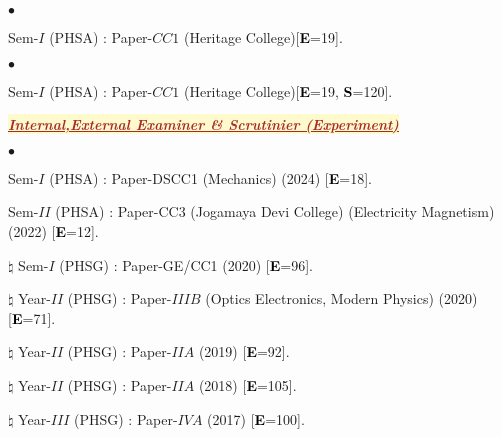 \documentclass[margin,line]{res}
\newenvironment{list1}{
  \begin{list}{\ding{113}}{%
      \setlength{\itemsep}{0in}
      \setlength{\parsep}{0in} \setlength{\parskip}{0in}
      \setlength{\topsep}{0in} \setlength{\partopsep}{0in} 
      \setlength{\leftmargin}{0.17in}}}{\end{list}}
\newenvironment{list2}{
  \begin{list}{$\bullet$}{%
      \setlength{\itemsep}{0in}
      \setlength{\parsep}{0in} \setlength{\parskip}{0in}
      \setlength{\topsep}{0in} \setlength{\partopsep}{0in} 
      \setlength{\leftmargin}{0.2in}}}{\end{list}}
\begin{document}
\begin{resume}
\begin{list2}
\item Sem-$I$ (PHSA) : Paper-$CC1$ (Heritage College)[\textcolor{black}{\bf E}=19].
\end{list2}
\begin{list1}
\item[] \textcolor{iris}{}
\vspace{1mm}
\end{list1}
\begin{list2}
\item Sem-$I$ (PHSA) : Paper-$CC1$ (Heritage College)[\textcolor{black}{\bf E}=19, \textcolor{black}{\bf S}=120]. 
\end{list2}
\begin{list1}
\item[] \colorbox{lemonchiffon}{\textcolor{brown}{\underline{\textbf{\textit{Internal,External Examiner \& Scrutinier (Experiment)}}}}}
\vspace{1mm}
\end{list1}
\begin{list2}
\item Sem-$I$ (PHSA) : Paper-DSCC1 (Mechanics) (2024) [\textcolor{black}{\bf E}=18]. 
\item Sem-$II$ (PHSA) : Paper-CC3 (Jogamaya Devi College) (Electricity Magnetism) (2022) [\textcolor{black}{\bf E}=12]. 
\item[$\pmb{\natural}$] Sem-$I$ (PHSG) : Paper-GE/CC1 (2020) [\textcolor{black}{\bf E}=96]. 
\item[$\pmb{\natural}$] Year-$II$ (PHSG) : Paper-$IIIB$ (Optics Electronics, Modern Physics) (2020) [\textcolor{black}{\bf E}=71]. 
\item[$\pmb{\natural}$] Year-$II$ (PHSG) : Paper-$IIA$ (2019) [\textcolor{black}{\bf E}=92].
\item[$\pmb{\natural}$] Year-$II$ (PHSG) : Paper-$IIA$ (2018) [\textcolor{black}{\bf E}=105].
\item[$\pmb{\natural}$] Year-$III$ (PHSG) : Paper-$IVA$ (2017) [\textcolor{black}{\bf E}=100].
\end{list2}
\vspace{2mm}


\end{resume}
\end{document}
